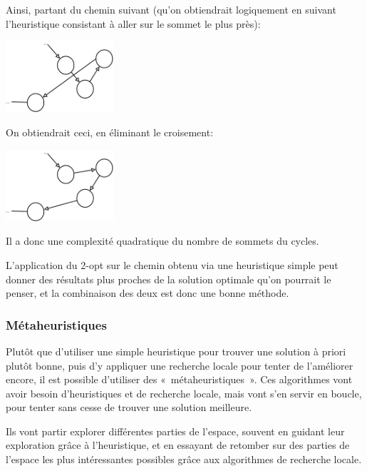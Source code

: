    Ainsi, partant du chemin suivant (qu'on obtiendrait logiquement en suivant
    l'heuristique consistant à aller sur le sommet le plus près):

    \begin{center}
    \includegraphics[width=0.3\textwidth]{graphes/2opt1.png}
    \end{center}

    On obtiendrait ceci, en éliminant le croisement:

    \begin{center}
    \includegraphics[width=0.3\textwidth]{graphes/2opt2.png}
    \end{center}

    Il a donc une complexité quadratique du nombre de sommets du cycles.

    L'application du 2-opt sur le chemin obtenu via une heuristique simple peut
    donner des résultats plus proches de la solution optimale qu'on pourrait le
    penser, et la combinaison des deux est donc une bonne méthode.

  \subsubsection{Métaheuristiques}

  Plutôt que d'utiliser une simple heuristique pour trouver une solution à priori plutôt
  bonne, puis d'y appliquer une recherche locale pour tenter de l'améliorer encore,
  il est possible d'utiliser des «~métaheuristiques~».
  Ces algorithmes vont avoir besoin d'heuristiques et de recherche locale, mais vont
  s'en servir en boucle, pour tenter sans cesse de trouver une solution meilleure.

  Ils vont partir explorer différentes parties de l'espace, souvent en guidant
  leur exploration grâce à l'heuristique, et en essayant de retomber sur des
  parties de l'espace les plus intéressantes possibles grâce aux algorithmes de
  recherche locale.

